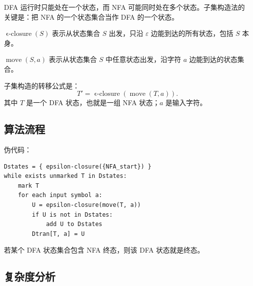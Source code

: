 \documentclass[UTF8,fontset=none,11pt]{ctexart}
\newenvironment{defbox}[1][]{%
  \par\medskip\noindent{\color{defrule}\rule{\linewidth}{1.1pt}}\par\nopagebreak
  \noindent{\bfseries\color{defrule}#1}\par\nopagebreak\smallskip}%
  {\par\nopagebreak\smallskip\noindent{\color{defrule}\rule{\linewidth}{0.4pt}}\par\medskip}
\newcommand{\eps}{\varepsilon}
\newcommand{\move}{\operatorname{move}}
\newcommand{\eclose}{\operatorname{\epsilon\text{-}closure}}
\begin{document}
DFA 运行时只能处在一个状态，而 NFA 可能同时处在多个状态。子集构造法的关键是：把 NFA 的一个状态集合当作 DFA 的一个状态。

\begin{defbox}[epsilon-closure]
\(\eclose(S)\) 表示从状态集合 \(S\) 出发，只沿 \(\eps\) 边能到达的所有状态，包括 \(S\) 本身。
\end{defbox}

\begin{defbox}[move]
\(\move(S,a)\) 表示从状态集合 \(S\) 中任意状态出发，沿字符 \(a\) 边能到达的状态集合。
\end{defbox}

子集构造的转移公式是：
\[
T'=\eclose(\move(T,a)).
\]
其中 \(T\) 是一个 DFA 状态，也就是一组 NFA 状态；\(a\) 是输入字符。

\subsection{算法流程}

\begin{center}
\end{center}

伪代码：

\begin{verbatim}
Dstates = { epsilon-closure({NFA_start}) }
while exists unmarked T in Dstates:
    mark T
    for each input symbol a:
        U = epsilon-closure(move(T, a))
        if U is not in Dstates:
            add U to Dstates
        Dtran[T, a] = U
\end{verbatim}

若某个 DFA 状态集合包含 NFA 终态，则该 DFA 状态就是终态。

\subsection{复杂度分析}
\end{document}
